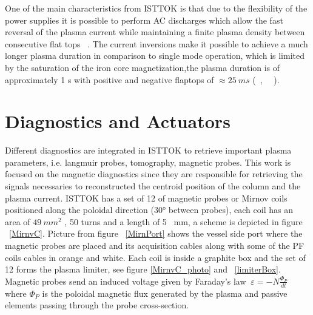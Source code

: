 One of the main characteristics from ISTTOK  is that due to the flexibility of the power supplies it is possible  to perform  AC  discharges  which  allow the fast reversal of the plasma current while maintaining a finite plasma density between consecutive flat tops  ~\cite{density}. The current inversions make it possible to achieve a much longer plasma duration in comparison to single mode operation, which is limited by the saturation of the iron core magnetization,the plasma duration is of approximately 1 s with positive and negative flaptops of $\approx 25~ms$ (~\cite{Fernandes1998}, ~\cite{Carvalho2015}~).







\section{Diagnostics and Actuators}

Different  diagnostics are integrated in ISTTOK to retrieve important plasma parameters, i.e. langmuir probes, tomography, magnetic probes. This work is focused on the magnetic diagnostics  since they are responsible for  retrieving the signals necessaries to reconstructed the centroid position of the column and the plasma current. ISTTOK has a set of 12 of magnetic  probes or Mirnov coils positioned along the poloidal direction (30° between  probes), each coil has an area of $49 ~mm^2$ , 50 turns and a length of 5 ~mm, a scheme is depicted in figure ~\ref{MirnvC}. Picture from figure ~\ref{MirnPort} shows the vessel side port where the magnetic probes are  placed and its acquisition cables along with some of the PF coils cables in orange and white. Each coil is inside a graphite box and the set of 12 forms the plasma limiter, see figure \ref{MirnvC_photo} and ~\ref{limiterBox}. Magnetic probes send an induced voltage given by Faraday's law $~\varepsilon = -N\frac{\Phi_P}{dt}$ where $\Phi_P$ is the poloidal magnetic flux generated by the plasma and passive elements passing through the probe cross-section.
\smallskip



